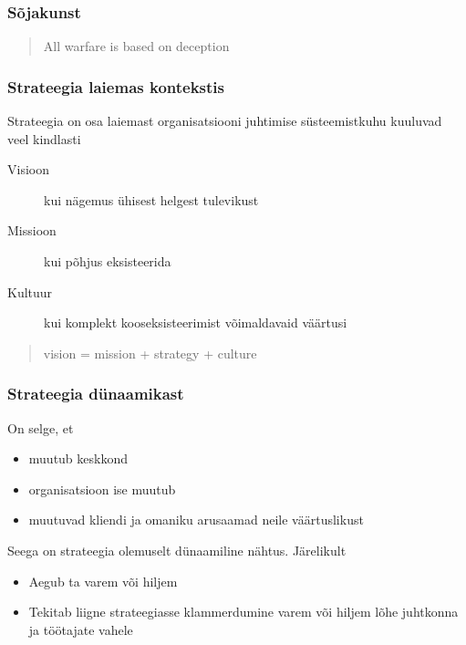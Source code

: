 \begin{frame}[fragile]
  \frametitle{Sõjakunst}
  \begin{quote}
    All warfare is based on deception
  \end{quote}

\end{frame}

\begin{frame}[fragile]
  \frametitle{Strateegia laiemas kontekstis}
  Strateegia on osa laiemast organisatsiooni juhtimise süsteemistkuhu kuuluvad veel kindlasti 
  	\begin{description}
		\item[Visioon] kui nägemus ühisest helgest tulevikust
		\item[Missioon] kui põhjus eksisteerida
		\item[Kultuur] kui komplekt kooseksisteerimist võimaldavaid väärtusi
	\end{description}	
	\begin{quote}
	vision = mission + strategy + culture \end{quote}\citep{lipton1996demystifying}
\end{frame}


\begin{frame}[fragile]
  \frametitle{Strateegia dünaamikast}
  On selge, et 
  \begin{itemize}
  	\item muutub keskkond
	\item organisatsioon ise muutub
	\item muutuvad kliendi ja omaniku arusaamad neile väärtuslikust
  \end{itemize}
  Seega on strateegia olemuselt dünaamiline nähtus. Järelikult
	\begin{itemize}
		\item Aegub ta varem või hiljem
		\item Tekitab liigne strateegiasse klammerdumine varem või hiljem lõhe juhtkonna ja töötajate vahele
	\end{itemize}
\end{frame}

